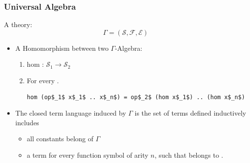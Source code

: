 \documentclass[t,10pt,numbers,fleqn,usenames,xcolor=dvipsnames]{beamer}
\begin{document}
\begin{frame}[fragile]
\frametitle{Universal Algebra}  
A theory: 
\[\Gamma = (\mathcal{S},\mathcal{F},\mathcal{E}) \]

\begin{itemize}
\item A Homomorphism between two $\Gamma$-Algebra:  
\begin{enumerate}
\item hom : $\mathcal{S}_1 \to \mathcal{S}_2$ 
\item For every . 
\begin{lstlisting}[mathescape]
hom (op$_1$ x$_1$ .. x$_n$) = op$_2$ (hom x$_1$) .. (hom x$_n$)
\end{lstlisting}
\end{enumerate}

\item The closed term language  induced by $\Gamma$ is the set of terms defined inductively includes 
\begin{itemize}
\item all constants belong of $\Gamma$  
\item a term  for every function symbol  of arity $n$, such that   belongs to . 
\end{itemize}

\end{itemize}
\end{frame}
\end{document}
